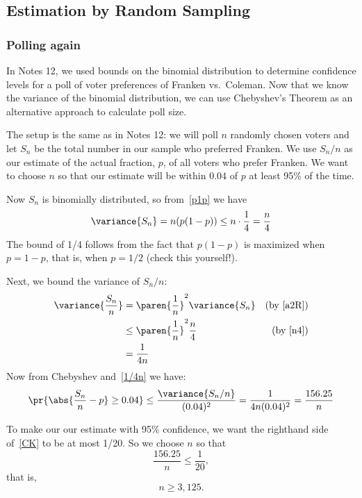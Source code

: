 \subsection{Estimation by Random Sampling}

\subsubsection{Polling again}

In Notes 12, we used bounds on the binomial distribution to determine
confidence levels for a poll of voter preferences of Franken vs.\ Coleman.
Now that we know the variance of the binomial distribution, we can use
Chebyshev's Theorem as an alternative approach to calculate poll size.

The setup is the same as in Notes 12: we will poll $n$ randomly chosen
voters and let $S_n$ be the total number in our sample who preferred
Franken.  We use $S_n/n$ as our estimate of the actual fraction, $p$, of
all voters who prefer Franken.  We want to choose $n$ so that our estimate
will be within $0.04$ of $p$ at least 95\% of the time.

Now $S_n$ is binomially distributed, so from~\eqref{p1p} we have
\[
\variance{S_n}  = n(p(1-p)) \leq n \cdot \frac{1}{4} = \frac{n}{4}\label{n4}
\]
The bound of 1/4 follows from the fact that $p(1-p)$ is maximized when $p
= 1-p$, that is, when $p=1/2$ (check this yourself!).

Next, we bound the variance of $S_n/n$:
\begin{align}
\variance{\frac{S_n}{n}}
       & = \paren{\frac{1}{n}}^2 \variance{S_n}
                     & \text{(by~\eqref{a2R})}\notag\\
       & \leq \paren{\frac{1}{n}}^2 \frac{n}{4} & \text{(by~\eqref{n4})}\notag\\
       & = \frac{1}{4n}\label{1/4n}
\end{align}
Now from Chebyshev and~\eqref{1/4n} we have:
\begin{equation}\label{CK}
\pr{\abs{\frac{S_n}{n} - p} \geq 0.04}
    \leq \frac{\variance{S_n/n}}{(0.04)^2}
       = \frac{1}{4n(0.04)^2} = \frac{156.25}{n}
\end{equation}

To make our our estimate with  95\% confidence, we want the righthand
side of~\eqref{CK} to be at most 1/20.  So we choose $n$ so that
\[
\frac{156.25}{n} \leq \frac{1}{20},
\]
that is,
\[
n \geq 3,125.
\]

